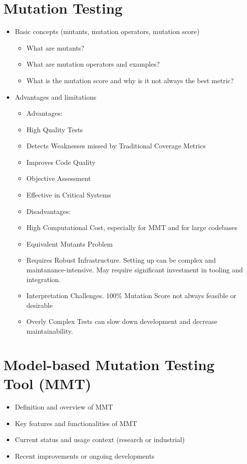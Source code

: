 \documentclass[sigplan, nonacm]{acmart}
\begin{document}
\section{Mutation Testing}
\begin{itemize}
	\item Basic concepts (mutants, mutation operators, mutation score)
	      \begin{itemize}
		      \item What are mutants?
		      \item What are mutation operators and examples?
		      \item What is the mutation score and why is it not always the best metric?
	      \end{itemize}
	\item Advantages and limitations
	      \begin{itemize}
		      \item Advantages:
		      \item High Quality Tests
		      \item Detects Weaknesses missed by Traditional Coverage Metrics
		      \item Improves Code Quality
		      \item Objective Assessment
		      \item Effective in Critical Systems
		      \item Disadvantages:
		      \item High Computational Cost, especially for MMT and for large codebases
		      \item Equivalent Mutants Problem
		      \item Requires Robust Infrastructure. Setting up can be complex and maintanance-intensive. May require significant investment in tooling and integration.
		      \item Interpretation Challenges. 100\% Mutation Score not always feasible or desirable
		      \item Overly Complex Tests can slow down development and decrease maintainability.
	      \end{itemize}
\end{itemize}

\section{Model-based Mutation Testing Tool (MMT)}
\begin{itemize}
	\item Definition and overview of MMT
	\item Key features and functionalities of MMT
	\item Current status and usage context (research or industrial)
	\item Recent improvements or ongoing developments
\end{itemize}
\end{document}
